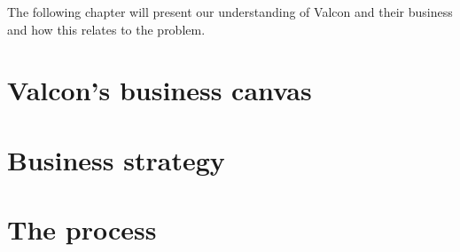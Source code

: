 The following chapter will present our understanding of Valcon and their business and how this relates to the problem.

\section{Valcon's business canvas}

\section{Business strategy}

\section{The process}
